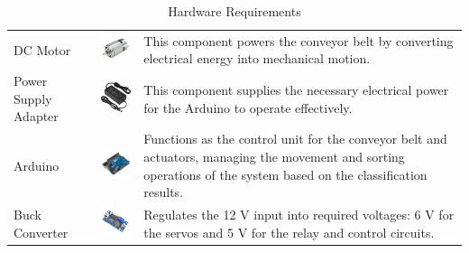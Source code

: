{\begin{longtable}{
		>{\centering\arraybackslash}m{3cm}  
		>{\centering\arraybackslash}m{4cm} 
		>{\arraybackslash}m{6cm}
	}
	\caption{Hardware Requirements} \label{tab:hardwarerequirements} \\
	\toprule
	\multicolumn{1}{c}{\textbf{Component}} &
	\multicolumn{1}{c}{\textbf{Image}} &
	\multicolumn{1}{c}{\textbf{Function}} \\
	\midrule
	
	\endfirsthead
	
	\midrule
	\endhead
	
	\bottomrule
	\endfoot
	
	DC Motor & \includegraphics[width=3cm]{figures/dc_motor} &
	This component powers the conveyor belt by converting electrical energy into mechanical motion. \\
	
	Power Supply Adapter & \includegraphics[width=3cm]{figures/adapter} &
	This component supplies the necessary electrical power for the Arduino to operate effectively. \\
	
	Arduino & \includegraphics[width=3cm]{figures/arduino} &
	Functions as the control unit for the conveyor belt and actuators, managing the movement and sorting operations of the system based on the classification results. \\
	
	Buck Converter & \includegraphics[width=3cm]{figures/buck_converter} &
	Regulates the 12 V input into required voltages: 6 V for the servos and 5 V for the relay and control circuits. \\
	

\end{longtable}}
